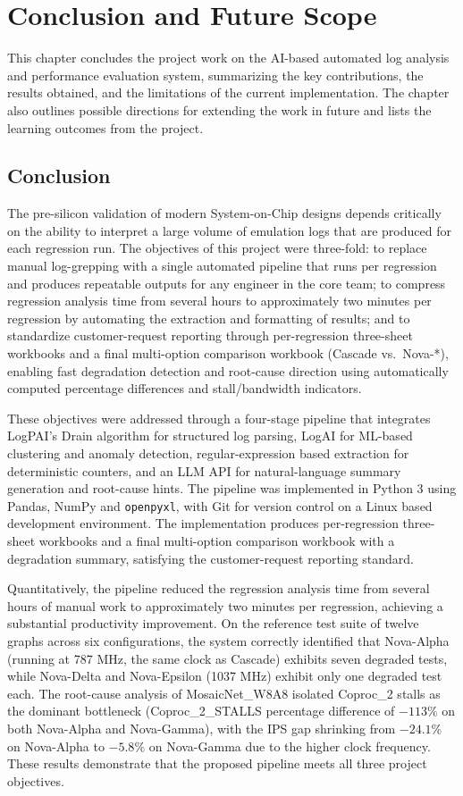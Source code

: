 \chapter{Conclusion and Future Scope}
This chapter concludes the project work on the AI-based automated log analysis and performance evaluation system, summarizing the key contributions, the results obtained, and the limitations of the current implementation. The chapter also outlines possible directions for extending the work in future and lists the learning outcomes from the project.

\section{Conclusion}
The pre-silicon validation of modern System-on-Chip designs depends critically on the ability to interpret a large volume of emulation logs that are produced for each regression run. The objectives of this project were three-fold: to replace manual log-grepping with a single automated pipeline that runs per regression and produces repeatable outputs for any engineer in the core team; to compress regression analysis time from several hours to approximately two minutes per regression by automating the extraction and formatting of results; and to standardize customer-request reporting through per-regression three-sheet workbooks and a final multi-option comparison workbook (Cascade vs.\ Nova-*), enabling fast degradation detection and root-cause direction using automatically computed percentage differences and stall/bandwidth indicators.

These objectives were addressed through a four-stage pipeline that integrates LogPAI's Drain algorithm for structured log parsing, LogAI for ML-based clustering and anomaly detection, regular-expression based extraction for deterministic counters, and an LLM API for natural-language summary generation and root-cause hints. The pipeline was implemented in Python 3 using Pandas, NumPy and \texttt{openpyxl}, with Git for version control on a Linux based development environment. The implementation produces per-regression three-sheet workbooks and a final multi-option comparison workbook with a degradation summary, satisfying the customer-request reporting standard.

Quantitatively, the pipeline reduced the regression analysis time from several hours of manual work to approximately two minutes per regression, achieving a substantial productivity improvement. On the reference test suite of twelve graphs across six configurations, the system correctly identified that Nova-Alpha (running at 787 MHz, the same clock as Cascade) exhibits seven degraded tests, while Nova-Delta and Nova-Epsilon (1037 MHz) exhibit only one degraded test each. The root-cause analysis of MosaicNet\_W8A8 isolated Coproc\_2 stalls as the dominant bottleneck (Coproc\_2\_STALLS percentage difference of \(-113\%\) on both Nova-Alpha and Nova-Gamma), with the IPS gap shrinking from \(-24.1\%\) on Nova-Alpha to \(-5.8\%\) on Nova-Gamma due to the higher clock frequency. These results demonstrate that the proposed pipeline meets all three project objectives.


